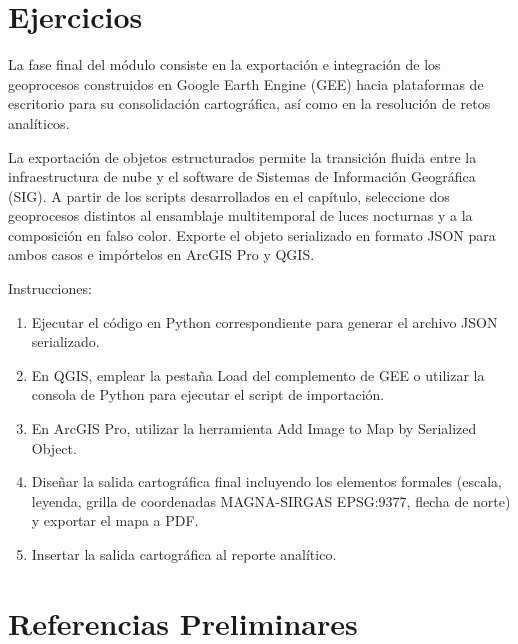 \documentclass[
  letterpaper,
  DIV=11,
  numbers=noendperiod]{scrartcl}
\providecommand{\tightlist}{%
  \setlength{\itemsep}{0pt}\setlength{\parskip}{0pt}}\usepackage{longtable,booktabs,array}
\newlength{\cslhangindent}
\newenvironment{CSLReferences}[2] %
 {\begin{list}{}{%
  \setlength{\itemindent}{0pt}
  \setlength{\leftmargin}{0pt}
  \setlength{\parsep}{0pt}
  \ifodd #1
   \setlength{\leftmargin}{\cslhangindent}
   \setlength{\itemindent}{-1\cslhangindent}
  \fi
  \setlength{\itemsep}{#2\baselineskip}}}
 {\end{list}}
\begin{document}
\section{Ejercicios}\label{ejercicios}

La fase final del módulo consiste en la exportación e integración de los
geoprocesos construidos en Google Earth Engine (GEE) hacia plataformas
de escritorio para su consolidación cartográfica, así como en la
resolución de retos analíticos.

La exportación de objetos estructurados permite la transición fluida
entre la infraestructura de nube y el software de Sistemas de
Información Geográfica (SIG). A partir de los scripts desarrollados en
el capítulo, seleccione dos geoprocesos distintos al ensamblaje
multitemporal de luces nocturnas y a la composición en falso color.
Exporte el objeto serializado en formato JSON para ambos casos e
impórtelos en ArcGIS Pro y QGIS.

Instrucciones:

\begin{enumerate}
\def\labelenumi{\arabic{enumi}.}
\tightlist
\item
  Ejecutar el código en Python correspondiente para generar el archivo
  JSON serializado.
\item
  En QGIS, emplear la pestaña Load del complemento de GEE o utilizar la
  consola de Python para ejecutar el script de importación.
\item
  En ArcGIS Pro, utilizar la herramienta Add Image to Map by Serialized
  Object.
\item
  Diseñar la salida cartográfica final incluyendo los elementos formales
  (escala, leyenda, grilla de coordenadas MAGNA-SIRGAS EPSG:9377, flecha
  de norte) y exportar el mapa a PDF.
\item
  Insertar la salida cartográfica al reporte analítico.
\end{enumerate}

\section{Referencias Preliminares}\label{referencias-preliminares}

\label{refs}
\begin{CSLReferences}{0}{1}
\end{CSLReferences}
\end{document}
